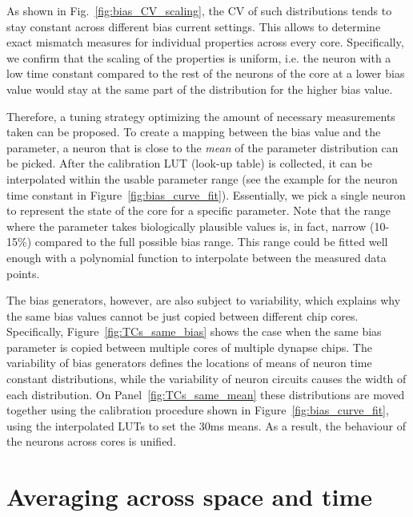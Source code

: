 \begin{figure}[b!]
  \label{fig:TC_tuning}
\end{figure}

As shown in Fig.~\ref{fig:bias_CV_scaling}, the CV of such distributions tends to stay constant across different bias current settings.
This allows to determine exact mismatch measures for individual properties across every core. Specifically, we confirm that the scaling of the properties is uniform, i.e. the neuron with a low time constant compared to the rest of the neurons of the core at a lower bias value would stay at the same part of the distribution for the higher bias value.


Therefore, a tuning strategy optimizing the amount of necessary measurements taken can be proposed. To create a mapping between the bias value and the parameter, a neuron that is close to the \emph{mean} of the parameter distribution can be picked. After the calibration LUT (look-up table) is collected, it can be interpolated within the usable parameter range (see the example for the neuron time constant in Figure~\ref{fig:bias_curve_fit}). Essentially, we pick a single neuron to represent the state of the core for a specific parameter. Note that the range where the parameter takes biologically plausible values is, in fact, narrow (10-15\%) compared to the full possible bias range. This range could be fitted well enough with a polynomial function to interpolate between the measured data points. 

The bias generators, however, are also subject to variability, which explains why the same bias values cannot be just copied between different chip cores. Specifically, Figure~\ref{fig:TCs_same_bias} shows the case when the same bias parameter is copied between multiple cores of multiple dynapse chips. The variability of bias generators defines the locations of means of neuron time constant distributions, while the variability of neuron circuits causes the width of each distribution. On Panel~\ref{fig:TCs_same_mean} these distributions are moved together using the calibration procedure shown in Figure~\ref{fig:bias_curve_fit}, using the interpolated LUTs to set the 30ms means. As a result, the behaviour of the neurons across cores is unified.
\\


\newpage
\section{Averaging across space and time}
\label{sec:averaging}

